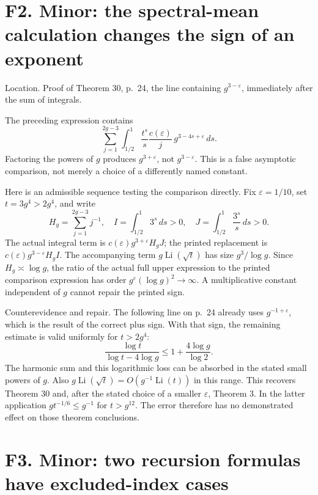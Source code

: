 \documentclass[10pt]{article}
\begin{document}
\section*{F2. Minor: the spectral-mean calculation changes the sign of an exponent}
Location. Proof of Theorem 30, p. 24, the line containing \(g^{3-\varepsilon}\), immediately after the sum of integrals.\par
The preceding expression contains \[\sum_{j=1}^{2g-3}\int_{1/2}^1
       \frac{t^s}{s}\frac{c(\varepsilon)}j\,g^{3-4s+\varepsilon}\,ds.\] Factoring the powers of \(g\) produces \(g^{3+\varepsilon}\), not \(g^{3-\varepsilon}\). This is a false asymptotic comparison, not merely a choice of a differently named constant.\par
Here is an admissible sequence testing the comparison directly. Fix \(\varepsilon=1/10\), set \(t=3g^4>2g^4\), and write \[H_g=\sum_{j=1}^{2g-3}j^{-1},\quad
 I=\int_{1/2}^1 3^s\,ds>0,\quad
 J=\int_{1/2}^1 \frac{3^s}{s}\,ds>0.\] The actual integral term is \(c(\varepsilon)g^{3+\varepsilon}H_gJ\); the printed replacement is \(c(\varepsilon)g^{3-\varepsilon}H_gI\). The accompanying term \(g\operatorname{Li}(\sqrt t)\) has size \(g^3/\log g\). Since \(H_g\asymp\log g\), the ratio of the actual full upper expression to the printed comparison expression has order \(g^\varepsilon(\log g)^2\to\infty\). A multiplicative constant independent of \(g\) cannot repair the printed sign.\par
Counterevidence and repair. The following line on p. 24 already uses \(g^{-1+\varepsilon}\), which is the result of the correct plus sign. With that sign, the remaining estimate is valid uniformly for \(t>2g^4\): \[\frac{\log t}{\log t-4\log g}
 \le 1+\frac{4\log g}{\log2}.\] The harmonic sum and this logarithmic loss can be absorbed in the stated small powers of \(g\). Also \(g\operatorname{Li}(\sqrt t)=O(g^{-1}\operatorname{Li}(t))\) in this range. This recovers Theorem 30 and, after the stated choice of a smaller \(\varepsilon\), Theorem 3. In the latter application \(gt^{-1/6}\le g^{-1}\) for \(t>g^{12}\). The error therefore has no demonstrated effect on those theorem conclusions.\par
\section*{F3. Minor: two recursion formulas have excluded-index cases}
\end{document}
